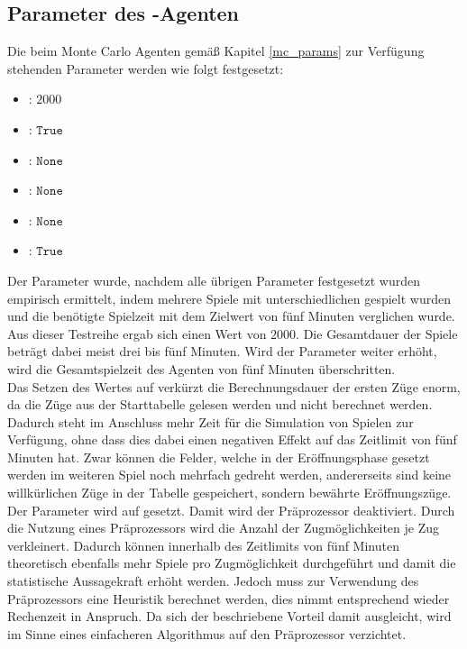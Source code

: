 \subsection{Parameter des -Agenten}
\label{eval:agents:params:subsec-mc}
Die beim Monte Carlo Agenten gemäß Kapitel \ref{mc_params} zur Verfügung stehenden Parameter werden wie folgt festgesetzt:
\begin{itemize}
\item {}: $2000$
\item {}: $\mathtt{True}$
\item {}: $\mathtt{None}$
\item {}: $\mathtt{None}$
\item {}: $\mathtt{None}$
\item {}: $\mathtt{True}$
\end{itemize}
Der Parameter  wurde, nachdem alle übrigen Parameter festgesetzt wurden empirisch ermittelt, indem mehrere Spiele mit unterschiedlichen  gespielt wurden und die benötigte Spielzeit mit dem Zielwert von fünf Minuten verglichen wurde. Aus dieser Testreihe ergab sich einen  Wert von $2000$. Die Gesamtdauer der Spiele beträgt dabei meist drei bis fünf Minuten. Wird der Parameter weiter erhöht, wird die Gesamtspielzeit des Agenten von fünf Minuten überschritten.
\\Das Setzen des Wertes auf  verkürzt die Berechnungsdauer der ersten Züge enorm, da die Züge aus der Starttabelle gelesen werden und nicht berechnet werden. Dadurch steht im Anschluss mehr Zeit für die Simulation von Spielen zur Verfügung, ohne dass dies dabei einen negativen Effekt auf das Zeitlimit von fünf Minuten hat. Zwar können die Felder, welche in der Eröffnungsphase gesetzt werden im weiteren Spiel noch mehrfach gedreht werden, andererseits sind keine willkürlichen Züge in der Tabelle gespeichert, sondern bewährte Eröffnungszüge.
\\Der Parameter  wird auf  gesetzt. Damit wird der Präprozessor deaktiviert. Durch die Nutzung eines Präprozessors wird die Anzahl der Zugmöglichkeiten je Zug verkleinert. Dadurch können innerhalb des Zeitlimits von fünf Minuten theoretisch ebenfalls mehr Spiele pro Zugmöglichkeit durchgeführt und damit die statistische Aussagekraft erhöht werden. Jedoch muss zur Verwendung des Präprozessors eine Heuristik berechnet werden, dies nimmt entsprechend wieder Rechenzeit in Anspruch. Da sich der beschriebene Vorteil damit ausgleicht, wird im Sinne eines einfacheren Algorithmus auf den Präprozessor verzichtet.
